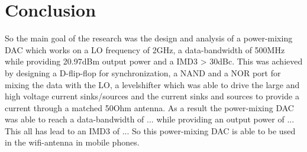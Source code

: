 \section{Conclusion}\label{sec:conclusion}
So the main goal of the research was the design and analysis of a power-mixing DAC which works on a LO frequency of 2GHz, a data-bandwidth of 500MHz while providing 20.97dBm output power and a IMD3 > 30dBc. This was achieved by designing a D-flip-flop for synchronization, a NAND and a NOR port for mixing the data with the LO, a levelshifter which was able to drive the large and high voltage current sinks/sources and the current sinks and sources to provide a current through a matched 50Ohm antenna. As a result the power-mixing DAC was able to reach a data-bandwidth of ... while providing an output power of ... This all has lead to an IMD3 of ... So this power-mixing DAC is able to be used in the wifi-antenna in mobile phones. 